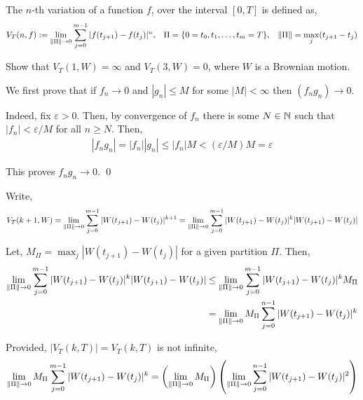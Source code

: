 \documentclass[10pt]{article}
\begin{document}
\begin{problem}[Exercise 7.3]
    The \( n \)-th variation of a function \( f \), over the interval \( [0,T] \) is defined as,
    \begin{align*}
        V_T(n,f) := 
        \lim_{\left\lVert\Pi\right\rVert\to 0} \sum_{j=0}^{m-1} |f(t_{j+1})-f(t_j)|^n, && \Pi = \{0=t_0,t_1, \ldots, t_m=T\}, && \left\lVert\Pi\right\rVert = \max_j(t_{j+1}-t_{j})
    \end{align*}

    Show that \( V_T(1,W) = \infty \) and \( V_T(3,W) = 0 \), where \( W \) is a Brownian motion.
\end{problem}


\begin{solution}[Solution]
We first prove that if \( f_n \to 0 \) and \( |g_n| \leq M \) for some \( |M| < \infty \) then \( (f_ng_n)\to 0 \).

Indeed, fix \( \varepsilon > 0 \). Then, by convergence of \( f_n \) there is some \( N\in\mathbb{N} \) such that \( |f_n| < \varepsilon/M \) for all \( n\geq N \). Then,
\begin{align*}
    |f_ng_n| = |f_n||g_n| \leq |f_n|M < (\varepsilon/M)M = \varepsilon
\end{align*}

This proves \( f_ng_n \to 0 \). \qed


Write,
\begin{align*}
    V_T(k+1,W) = 
    \lim_{\left\lVert\Pi\right\rVert\to 0} \sum_{j=0}^{m-1} |W(t_{j+1})-W(t_j)|^{k+1} = 
    \lim_{\left\lVert\Pi\right\rVert\to 0} \sum_{j=0}^{m-1} |W(t_{j+1})-W(t_j)|^k|W(t_{j+1})-W(t_j)|
\end{align*}

Let, \( M_\Pi = \max_j |W(t_{j+1}) - W(t_j)| \) for a given partition \( \Pi \). Then,
\begin{align*}
    \lim_{\left\lVert\Pi\right\rVert\to 0} \sum_{j=0}^{m-1} |W(t_{j+1})-W(t_j)|^k|W(t_{j+1})-W(t_j)| 
    &\leq \lim_{\left\lVert\Pi\right\rVert\to 0} \sum_{j=0}^{m-1} |W(t_{j+1})-W(t_j)|^k M_\Pi 
    \\&= \lim_{\left\lVert\Pi\right\rVert\to 0} M_\Pi \sum_{j=0}^{n-1} |W(t_{j+1})-W(t_j)|^k
\end{align*}

Provided, \( |V_T(k,T)| = V_T(k,T) \) is not infinite,
\begin{align*}
    \lim_{\left\lVert\Pi\right\rVert\to 0} M_\Pi \sum_{j=0}^{m-1} |W(t_{j+1})-W(t_j)|^k
    = \left( \lim_{\left\lVert\Pi\right\rVert\to 0} M_\Pi \right) \left( \lim_{\left\lVert\Pi\right\rVert\to 0} \sum_{j=0}^{n-1} |W(t_{j+1})-W(t_j)|^2 \right)
\end{align*}


\end{solution}
\end{document}
